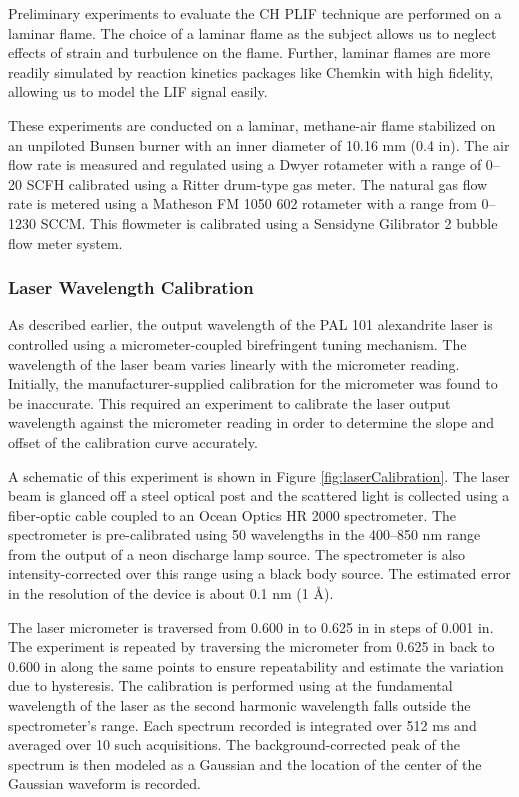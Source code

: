 Preliminary experiments to evaluate the CH PLIF technique are performed on a laminar flame.
The choice of a laminar flame as the subject allows us to neglect effects of strain and turbulence on the flame.
Further, laminar flames are more readily simulated by reaction kinetics packages like Chemkin with high fidelity, allowing us to model the LIF signal easily.

These experiments are conducted on a laminar, methane-air flame stabilized on an unpiloted Bunsen burner with an inner diameter of 10.16 mm (0.4 in).
The air flow rate is measured and regulated using a Dwyer rotameter with a range of 0--20 SCFH calibrated using a Ritter drum-type gas meter.
The natural gas flow rate is metered using a Matheson FM 1050 602 rotameter with a range from 0--1230 SCCM.
This flowmeter is calibrated using a Sensidyne Gilibrator 2 bubble flow meter system.

\subsubsection{Laser Wavelength Calibration}
\label{subsubsec:plif-laser-wavelength-calibration}



As described earlier, the output wavelength of the PAL 101 alexandrite laser is controlled using a micrometer-coupled birefringent tuning mechanism.
The wavelength of the laser beam varies linearly with the micrometer reading.
Initially, the manufacturer-supplied calibration for the micrometer was found to be inaccurate.
This required an experiment to calibrate the laser output wavelength against the micrometer reading in order to determine the slope and offset of the calibration curve accurately.

A schematic of this experiment is shown in Figure \ref{fig:laserCalibration}.
The laser beam is glanced off a steel optical post and the scattered light is collected using a fiber-optic cable coupled to an Ocean Optics HR 2000 spectrometer.
The spectrometer is pre-calibrated using 50 wavelengths in the 400--850 nm range from the output of a neon discharge lamp source.
The spectrometer is also intensity-corrected over this range using a black body source.
The estimated error in the resolution of the device is about 0.1 nm (1 \AA).

The laser micrometer is traversed from 0.600 in to 0.625 in in steps of 0.001 in.
The experiment is repeated by traversing the micrometer from 0.625 in back to 0.600 in along the same points to ensure repeatability and estimate the variation due to hysteresis.
The calibration is performed using at the fundamental wavelength of the laser as the second harmonic wavelength falls outside the spectrometer's range.
Each spectrum recorded is integrated over 512 ms and averaged over 10 such acquisitions.
The background-corrected peak of the spectrum is then modeled as a Gaussian and the location of the center of the Gaussian waveform is recorded.

